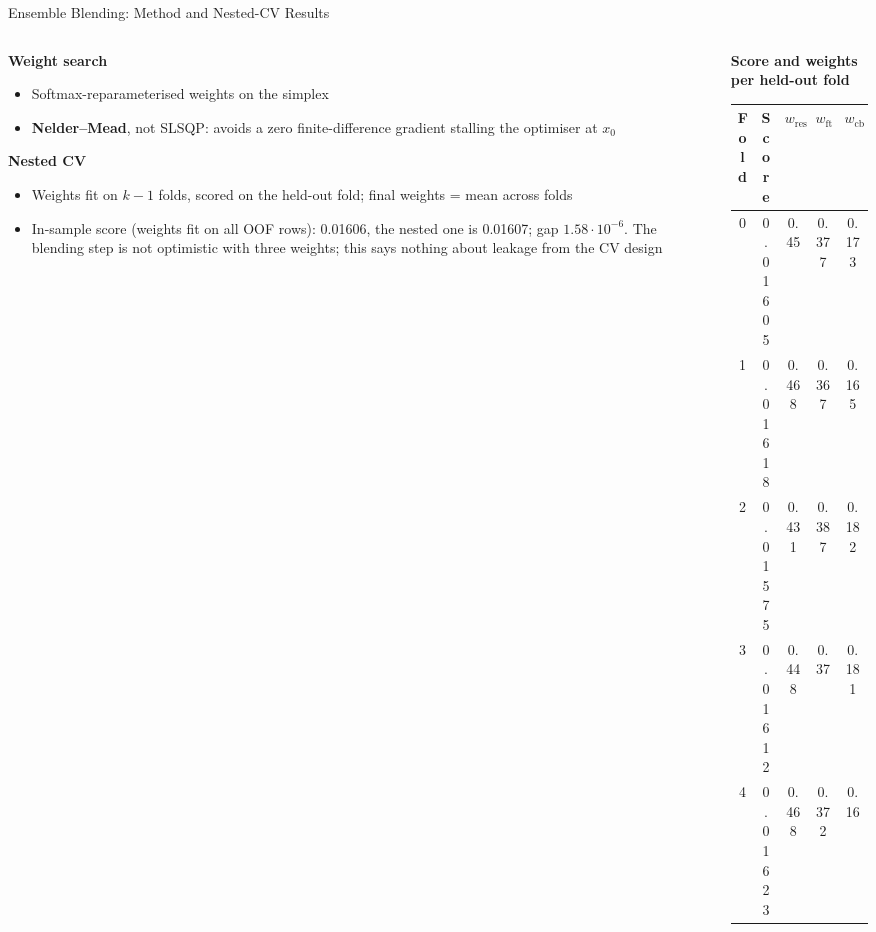 \documentclass[9pt,aspectratio=169]{beamer}
\begin{document}
\begin{frame}{Ensemble Blending: Method and Nested-CV Results}
  \begin{columns}[T]
    \begin{column}{0.46\textwidth}
      \footnotesize
      \textbf{Weight search}
      \begin{itemize}
        \item Softmax-reparameterised weights on the simplex
        \item \textbf{Nelder--Mead}, not SLSQP: avoids a zero finite-difference gradient stalling the optimiser at $x_0$
      \end{itemize}
      \textbf{Nested CV}
      \begin{itemize}
        \item Weights fit on $k-1$ folds, scored on the held-out fold; final weights = mean across folds
        \item In-sample score (weights fit on all OOF rows): 0.01606, the nested one is 0.01607; gap $1.58\cdot10^{-6}$. The blending step is not optimistic with three weights; this says nothing about leakage from the CV design
      \end{itemize}
    \end{column}
    \begin{column}{0.54\textwidth}
      \centering
      {\small\bfseries Score and weights per held-out fold}\\[1mm]
      \small
      \begin{tabular}{@{}ccccc@{}}
        \toprule
        \textbf{Fold} & \textbf{Score} & $w_{\text{resnet}}$ & $w_{\text{ft}}$ & $w_{\text{cb}}$ \\
        \midrule
        0 & 0.01605 & 0.45 & 0.377 & 0.173 \\
        1 & 0.01618 & 0.468 & 0.367 & 0.165 \\
        2 & 0.01575 & 0.431 & 0.387 & 0.182 \\
        3 & 0.01612 & 0.448 & 0.37 & 0.181 \\
        4 & 0.01623 & 0.468 & 0.372 & 0.16 \\
        \bottomrule
      \end{tabular}
    \end{column}
  \end{columns}
  \vspace{1mm}
  \begin{columns}[T]

\end{columns}
\end{frame}
\end{document}
